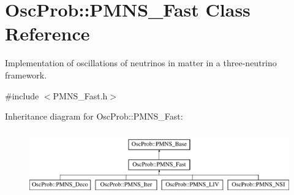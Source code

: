 \hypertarget{classOscProb_1_1PMNS__Fast}{}\section{Osc\+Prob\+:\+:P\+M\+N\+S\+\_\+\+Fast Class Reference}
\label{classOscProb_1_1PMNS__Fast}


Implementation of oscillations of neutrinos in matter in a three-\/neutrino framework.  




{\ttfamily \#include $<$P\+M\+N\+S\+\_\+\+Fast.\+h$>$}

Inheritance diagram for Osc\+Prob\+:\+:P\+M\+N\+S\+\_\+\+Fast\+:\begin{figure}[H]
\begin{center}
\leavevmode
\includegraphics[height=2.818792cm]{classOscProb_1_1PMNS__Fast}
\end{center}
\end{figure}

